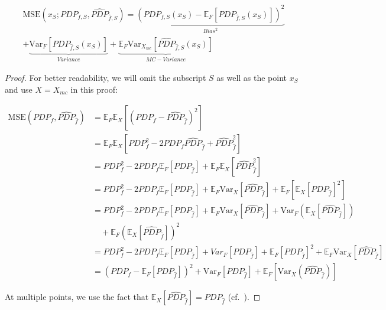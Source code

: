 \documentclass[runningheads]{llncs}
\begin{document}
\begin{equation}
    \begin{split}
        \text{MSE}(x_S; PDP_{f,S}, \widehat{PDP}_{\hat f,S})
        = \underbrace{{(PDP_{f,S}(x_S) - \mathbb{E}_F[PDP_{\hat{f}, S}(x_S)])}^2}_{Bias^2} \\
        + \underbrace{\text{Var}_F[PDP_{\hat{f},S}(x_S)]}_{Variance} + \underbrace{\mathbb{E}_F\text{Var}_{X_{mc}}[\widehat{PDP}_{\hat{f},S}(x_S)]}_{MC-Variance}
    \end{split}
\end{equation}

\begin{proof}
    For better readability, we will omit the subscript $S$ as well as the point $x_S$ and use $X=X_{mc}$ in this proof:

    \begin{align*}
        \text{MSE}(PDP_{f}, \widehat{PDP}_{\hat f})
         & = \mathbb{E}_F\mathbb{E}_X[(PDP_f - \widehat{PDP}_{\hat f})^2]                                                                                         \\
         & = \mathbb{E}_F \mathbb{E}_X[PDP_f^2 - 2PDP_f\widehat{PDP}_{\hat f} + \widehat{PDP}_{\hat f}^2]                                                         \\
         & = PDP_f^2 - 2PDP_f\mathbb{E}_F[PDP_{\hat f}] + \mathbb{E}_F\mathbb{E}_X[\widehat{PDP}_{\hat f}^2]                                                      \\
         & = PDP_f^2 - 2PDP_f\mathbb{E}_F[PDP_{\hat f}] + \mathbb{E}_F\text{Var}_X[\widehat{PDP}_{\hat f}] + \mathbb{E}_F[\mathbb{E}_X[\widehat{PDP}_{\hat f}]^2] \\
         & = PDP_f^2 - 2PDP_f\mathbb{E}_F[PDP_{\hat f}] + \mathbb{E}_F\text{Var}_X[\widehat{PDP}_{\hat f}] + \text{Var}_F(\mathbb{E}_X[\widehat{PDP}_{\hat f}])   \\
         & \quad + \mathbb{E}_F(\mathbb{E}_X[\widehat{PDP}_{\hat f}])^2                                                                                           \\
         & = PDP_f^2 - 2PDP_f\mathbb{E}_F[PDP_{\hat f}] +  Var_F[PDP_{\hat f}] + \mathbb{E}_F[PDP_{\hat f}]^2 + \mathbb{E}_F\text{Var}_X[\widehat{PDP}_{\hat f}]  \\
         & = (PDP_f - \mathbb{E}_F[PDP_{\hat f}])^2 + \text{Var}_F[PDP_{\hat f}] + \mathbb{E}_F[\text{Var}_X(\widehat{PDP}_{\hat f})]
    \end{align*}

    \noindent At multiple points, we use the fact that $\mathbb{E}_X[\widehat{PDP}_{\hat f}]
        = PDP_{\hat f}$ (cf.~\cite{molnar_relating_2023}).
\end{proof}
\end{document}
